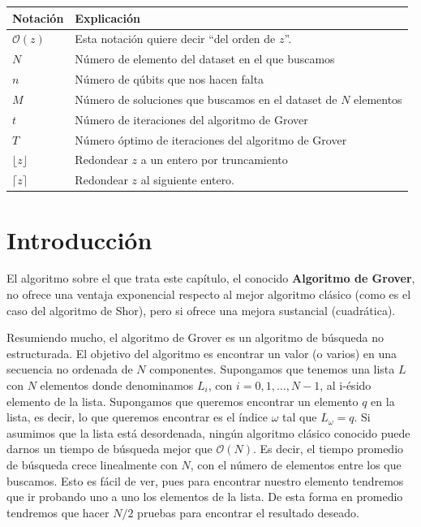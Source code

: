 \documentclass[a4paper,11pt]{book} %
\numberwithin{equation}{chapter}
\begin{document}
\begin{table}[H]
\centering
\begin{tabular}{ll}
Notación                      & Explicación \\
\hline
\textbf{$\mathcal{O}(z)$}     & Esta notación quiere decir ``del orden de $z$''.                 \\ \hline
\textbf{$N$}                  & Número de elemento del dataset en el que buscamos                \\ \hline
\textbf{$n$}                  & Número de qúbits que nos hacen falta                             \\ \hline
\textbf{$M$}                  & Número de soluciones que buscamos en el dataset de $N$ elementos \\ \hline
\textbf{$t$}                  & Número de iteraciones del algoritmo de Grover                    \\ \hline
\textbf{$T$}                  & Número óptimo de iteraciones del algoritmo de Grover             \\ \hline
\textbf{$\lfloor z \rfloor $} & Redondear $z$ a un entero por truncamiento                       \\ \hline
\textbf{$\lceil z \rceil$}    & Redondear $z$ al siguiente entero.                               \\ \hline
\end{tabular}
\end{table}



\section{Introducción}

 El algoritmo sobre el que trata este capítulo, el conocido \textbf{Algoritmo de Grover}, no ofrece una ventaja exponencial respecto al mejor algoritmo clásico (como es el caso del algoritmo de Shor), pero si ofrece una mejora sustancial (cuadrática).

Resumiendo mucho, el algoritmo de Grover es un algoritmo de búsqueda no estructurada. El objetivo del algoritmo es encontrar un valor (o varios) en una secuencia no ordenada de $N$ componentes. Supongamos que tenemos una lista $L$ con $N$ elementos donde denominamos $L_i$, con $i=0,1,\dots,N-1$, al i-ésido elemento de la lista. Supongamos que queremos encontrar un elemento $q$ en la lista, es decir, lo que queremos encontrar es el índice $\omega$ tal que $L_\omega = q$. Si asumimos que la lista está desordenada, ningún algoritmo clásico conocido puede darnos un tiempo de búsqueda mejor que $\mathcal{O}(N)$. Es decir, el tiempo promedio de búsqueda crece linealmente con $N$, con el número de elementos entre los que buscamos. Esto es fácil de ver, pues para encontrar nuestro elemento tendremos que ir probando uno a uno los elementos de la lista. De esta forma en promedio tendremos que hacer $N/2$ pruebas para encontrar el resultado deseado. 
\end{document}
